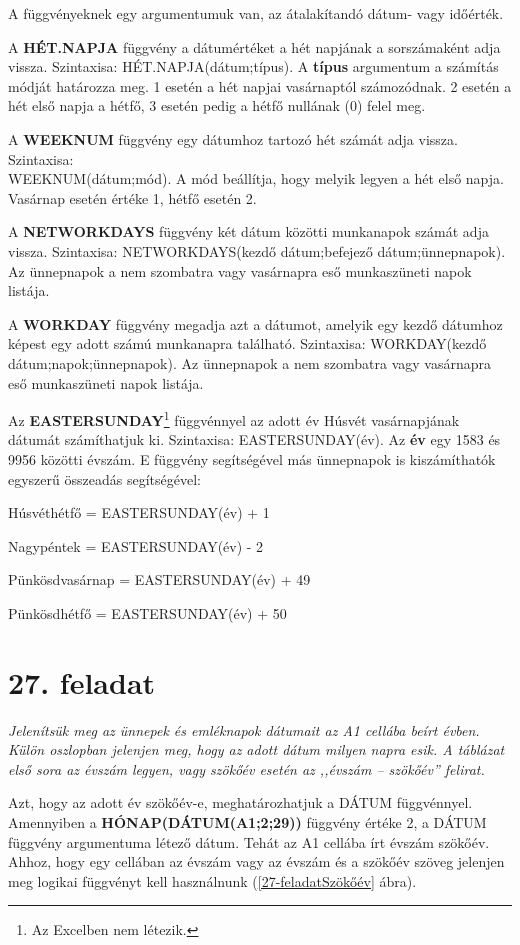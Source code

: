 A függvényeknek egy argumentumuk van, az átalakítandó dátum-
vagy időérték.

A \textbf{HÉT.NAPJA} függvény a dátumértéket a hét napjának
a sorszámaként adja vissza. Szintaxisa: HÉT.NAPJA(dátum;típus). A
\textbf{típus} argumentum a számítás módját határozza
meg. 1 esetén a hét napjai vasárnaptól számozódnak. 2
esetén a hét első napja a hétfő, 3 esetén pedig a
hétfő nullának (0) felel meg.

A \textbf{WEEKNUM} függvény egy dátumhoz tartozó hét
számát adja vissza. Szintaxisa:\\
WEEKNUM(dátum;mód). A mód
beállítja, hogy melyik legyen a hét első napja. Vasárnap
esetén értéke 1, hétfő esetén 2.

A \textbf{NETWORKDAYS} függvény két dátum közötti munkanapok
számát adja vissza. Szintaxisa: NETWORKDAYS(kezdő
dátum;befejező dátum;ünnepnapok). Az ünnepnapok a nem szombatra
vagy vasárnapra eső munkaszüneti napok listája. 

A \textbf{WORKDAY} függvény megadja azt a dátumot, amelyik egy
kezdő dátumhoz képest egy adott számú munkanapra
található. Szintaxisa: WORKDAY(kezdő
dátum;napok;ünnepnapok). Az ünnepnapok a nem szombatra
vagy vasárnapra eső munkaszüneti napok listája. 

Az \textbf{EASTERSUNDAY}\footnote{Az Excelben nem létezik.} függvénnyel az adott év Húsvét
vasárnapjának dátumát számíthatjuk ki. Szintaxisa:
EASTERSUNDAY(év).  Az \textbf{év} egy 1583 és 9956 közötti
évszám. E függvény segítségével más ünnepnapok is
kiszámíthatók egyszerű összeadás segítségével:

Húsvéthétfő = EASTERSUNDAY(év) + 1

Nagypéntek = EASTERSUNDAY(év) - 2

Pünkösdvasárnap = EASTERSUNDAY(év) + 49

Pünkösdhétfő = EASTERSUNDAY(év) + 50


\section{27. feladat}

{\itshape
Jelenítsük meg az ünnepek és emléknapok dátumait az A1
cellába beírt évben. Külön oszlopban jelenjen meg, hogy az
adott dátum milyen napra esik. A táblázat első sora az
évszám legyen, vagy szökőév esetén az ,,évszám -- szökőév''
felirat.}

Azt, hogy az adott év szökőév-e, meghatározhatjuk a DÁTUM
függvénnyel. Amennyiben a
{\sffamily\bfseries{HÓNAP(DÁTUM(A1;2;29))}} függvény értéke 2,
a DÁTUM függvény argumentuma
létező dátum. Tehát az A1 cellába írt évszám
szökőév. Ahhoz, hogy egy cellában az évszám vagy az
évszám és a szökőév szöveg jelenjen meg logikai
függvényt kell használnunk (\ref{27-feladatSzökőév} ábra).

